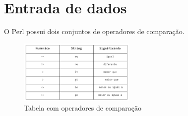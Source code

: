 \chapter{Entrada de dados}

O Perl possui dois conjuntos de operadores de compara\c{c}\~ao. 

\begin{figure}[!htb]
	\centering
	\includegraphics[width=0.5\textwidth]{../5_figuras/image17}
	\caption{Tabela com operadores de compara\c{c}\~ao}
\end{figure}


